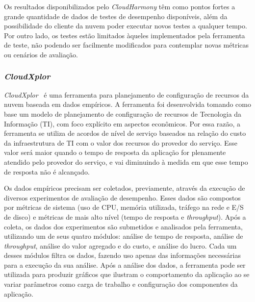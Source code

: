 Os resultados disponibilizados pelo {\em CloudHarmony} têm como pontos fortes a
grande quantidade de dados de testes de desempenho disponíveis, além da possibilidade do cliente da
nuvem poder executar novos testes a qualquer tempo. Por outro lado, os testes estão limitados àqueles implementados pela ferramenta de teste, não podendo ser facilmente modificados para contemplar novas métricas ou cenários de avaliação.

\subsubsection{{\em CloudXplor}}

{\em CloudXplor}~\cite{malkowski2010cloudxplor} é uma ferramenta para
planejamento de configuração de recursos da nuvem baseada em dados empíricos. A ferramenta
foi desenvolvida tomando como base um modelo de planejamento de configuração de
recursos de Tecnologia da Informação (TI), com foco explícito em aspectos econômicos.
Por essa razão, a ferramenta se utiliza de acordos de nível de serviço baseados na relação do custo
da infraestrutura de TI com o valor dos recursos do provedor do serviço. Esse
valor será maior quando o tempo de resposta da aplicação for plenamente atendido
pelo provedor do serviço, e vai diminuindo à medida em que esse tempo de resposta
não é alcançado.

Os dados empíricos precisam ser coletados, previamente, através da execução de diversos experimentos de avaliação de desempenho. Esses dados
são compostos por métricas de sistema (uso de CPU, memória utilizada, tráfego na rede e E/S de disco) e métricas de mais alto nível (tempo de resposta e \textit{throughput}). Após a coleta, os dados dos experimentos são submetidos e analisados pela ferramenta, utilizando um de seus quatro módulos: análise de tempo de
resposta, análise de \textit{throughput}, análise do valor agregado e do custo,
e análise do lucro. Cada um desses módulos filtra os dados, fazendo uso apenas
das informações necessárias para a execução da sua análise. Após a análise dos
 dados, a ferramenta pode ser utilizada para produzir gráficos que ilustram o comportamento da aplicação ao se variar
parâmetros como carga de trabalho e configuração dos componentes da aplicação.


